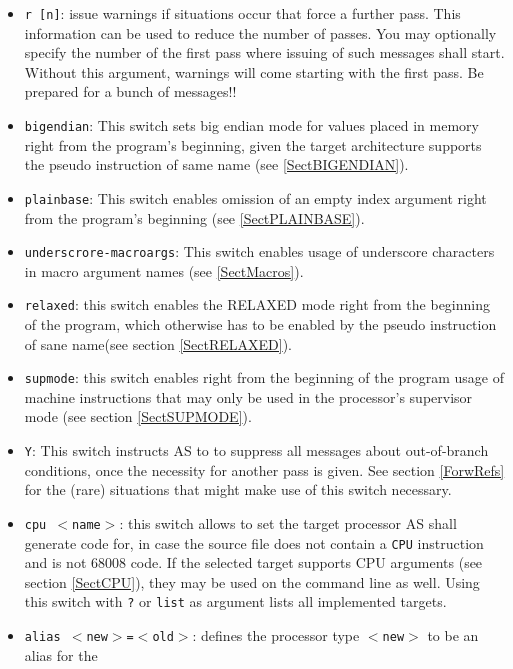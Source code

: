 \documentclass[12pt,twoside]{report}
\newcommand{\tty}[1]{{\tt #1}}
\newcommand{\asname}{{AS}}
\begin{document}
\begin{itemize}
{      used in conjunction with the \tty{P} switch, if only the macro
      processor of \asname{} shall be used.}
\item{\tty{r [n]}: issue warnings if situations occur that force a further
      pass. This information can be used to reduce the number of
      passes.  You may optionally specify the number of the
      first pass where issuing of such messages shall start.
      Without this argument, warnings will come starting with
      the first pass.  Be prepared for a bunch of messages!!}
\item{\tty{bigendian}: This switch sets big endian mode for values placed
      in memory right from the program's beginning, given the target
      architecture supports the pseudo instruction of same name (see
      \ref{SectBIGENDIAN}).}
\item{\tty{plainbase}: This switch enables omission of an empty index
      argument right from the program's beginning (see \ref{SectPLAINBASE}).}
\item{\tty{underscrore-macroargs}: This switch enables usage of underscore characters
      in macro argument names (see \ref{SectMacros}).}
\item{\tty{relaxed}: this switch enables the RELAXED mode right from the
      beginning of the program, which otherwise has to be enabled by the
      pseudo instruction of sane name(see section \ref{SectRELAXED}).}
\item{\tty{supmode}: this switch enables right from the beginning of the
      program usage of machine instructions that may only be used in the
      processor's supervisor mode (see section \ref{SectSUPMODE}).}
\item{\tty{Y}: This switch instructs \asname{} to to suppress all messages about
      out-of-branch conditions, once the necessity for another pass is given.
      See section \ref{ForwRefs} for the (rare) situations that might make
      use of this switch necessary.}
\item{\tty{cpu $<$name$>$}: this switch allows to set the target processor
      \asname{} shall generate code for, in case the source file does not contain
      a {\tt CPU} instruction and is not 68008 code.  If the selected target
      supports CPU arguments (see section \ref{SectCPU}), they may be used
      on the command line as well.  Using this switch with \verb!?! or {\tt list}
      as argument lists all implemented targets.}
\item{\tty{alias $<$new$>$=$<$old$>$}:
      defines the processor type \tty{$<$new$>$} to be an alias for the
}
\end{itemize}
\end{document}
